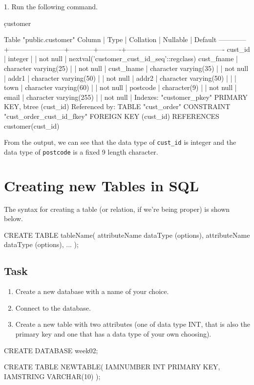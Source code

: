 1. Run the following command.
\begin{sql}
\d customer
\end{sql}
\begin{pseudo*}
    Table "public.customer"
    Column   |          Type          | Collation | Nullable |                  Default
 ------------+------------------------+-----------+----------+-------------------------------------------      
  cust_id    | integer                |           | not null | nextval('customer_cust_id_seq'::regclass)       
  cust_fname | character varying(25)  |           | not null |
  cust_lname | character varying(35)  |           | not null |
  addr1      | character varying(50)  |           | not null |
  addr2      | character varying(50)  |           |          |
  town       | character varying(60)  |           | not null |
  postcode   | character(9)           |           | not null |
  email      | character varying(255) |           | not null |
 Indexes:
     "customer_pkey" PRIMARY KEY, btree (cust_id)
 Referenced by:
     TABLE "cust_order" CONSTRAINT "cust_order_cust_id_fkey" FOREIGN KEY (cust_id) REFERENCES customer(cust_id) 
\end{pseudo*}
From the output, we can see that the data type of \verb|cust_id| is integer and the data type of \verb|postcode| is a fixed 9 length character.

\section*{Creating new Tables in SQL}
The syntax for creating a table (or relation, if we're being proper) is shown below.
\begin{sql}
CREATE TABLE tableName(
attributeName dataType (options),
attributeName dataType (options),
...
);
\end{sql}

\subsection*{Task}
\begin{enumerate}
    \item Create a new database with a name of your choice.
    \item Connect to the database.
    \item Create a new table with two attributes (one of data type INT, that is also the primary key and one that has a data type of your own choosing).
\end{enumerate}
\begin{sql}
CREATE DATABASE week02;

CREATE TABLE NEWTABLE(
IAMNUMBER INT PRIMARY KEY,
IAMSTRING VARCHAR(10)
);
\end{sql}

